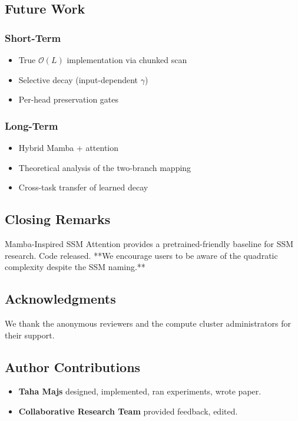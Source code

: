 \subsection{Future Work}

\subsubsection{Short-Term}
\begin{itemize}
\item True $\mathcal{O}(L)$ implementation via chunked scan
\item Selective decay (input-dependent $\gamma$)
\item Per-head preservation gates

\end{itemize}
\subsubsection{Long-Term}
\begin{itemize}
\item Hybrid Mamba + attention
\item Theoretical analysis of the two-branch mapping
\item Cross-task transfer of learned decay

\end{itemize}
\subsection{Closing Remarks}

Mamba-Inspired SSM Attention provides a pretrained-friendly baseline for 
SSM research. Code released. **We encourage users to be aware of the 
quadratic complexity despite the SSM naming.**

\subsection{Acknowledgments}

We thank the anonymous reviewers and the compute cluster administrators for their support.

\subsection{Author Contributions}

\begin{itemize}
\item \textbf{Taha Majs} designed, implemented, ran experiments, wrote paper.
\item \textbf{Collaborative Research Team} provided feedback, edited.

\end{itemize}
